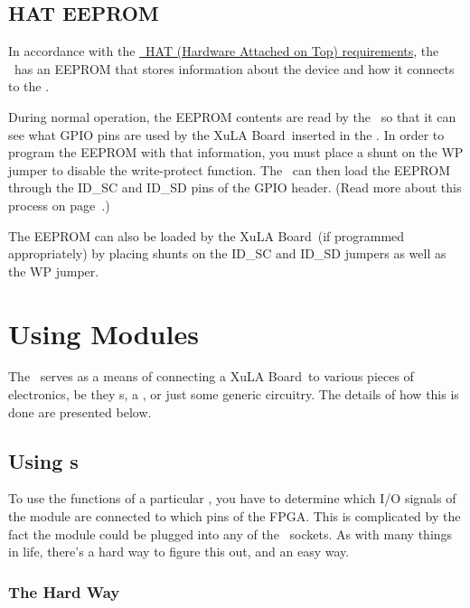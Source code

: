 \documentclass[letterpaper,11pt,oneside]{memoir}
\newcommand{\xula}{XuLA Board}
\begin{document}
\pagebreak %

\section{HAT EEPROM}

In accordance with the 
\href{https://github.com/raspberrypi/hats}{\rpi\ HAT (Hardware Attached on Top) requirements},
the \product\ has an EEPROM that stores information about the device and how it
connects to the \rpi.


During normal operation, the EEPROM contents are read by the \rpi\ so that it can see
what GPIO pins are used by the \xula\ inserted in the \product.
In order to program the EEPROM with that information, you must place a shunt on
the WP jumper to disable the write-protect function.
The \rpi\ can then load the EEPROM through the ID\_SC and ID\_SD pins of the 
GPIO header.
(Read more about this process on page~\pageref{sec:GPIOConfig}.)

The EEPROM can also be loaded by the \xula\ (if programmed appropriately) by placing shunts
on the ID\_SC and ID\_SD jumpers as well as the WP jumper.


\chapter{Using Modules}

The \product\ serves as a means of connecting a \xula\ to various pieces of
electronics, be they \digpmod s, a \rpi, or just some generic circuitry.
The details of how this is done are presented below.

\section{Using \digpmod s}

To use the functions of a particular \digpmod, you have to determine which
I/O signals of the module are connected to which pins of the FPGA.
This is complicated by the fact the module could be plugged into any of the
\digpmod\ sockets.
As with many things in life, there's a hard way to figure this out, and an easy way.

\subsection{The Hard Way}
\end{document}

